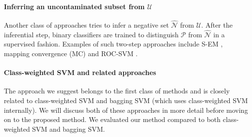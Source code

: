 \documentclass[preprint,elsarticle-num,12pt]{elsarticle}
\begin{document}
\paragraph{Inferring an uncontaminated subset from $\mathcal{U}$}
Another class of approaches tries to infer a negative set $\hat{\mathcal{N}}$ from $\mathcal{U}$. After the inferential step, binary classifiers are trained to distinguish $\mathcal{P}$ from $\mathcal{\hat{N}}$ in a supervised fashion. Examples of such two-step approaches include S-EM \citep{liu02partially}, mapping convergence (MC) \citep{Yu:2005:SCM:1108759.1108762} and ROC-SVM \citep{Li03learningto}.

\paragraph{Class-weighted SVM and related approaches} The approach we suggest belongs to the first class of methods and is closely related to class-weighted SVM and bagging SVM (which uses class-weighted SVM internally). We will discuss both of these approaches in more detail before moving on to the proposed method. We evaluated our method compared to both class-weighted SVM and bagging SVM.
\end{document}

